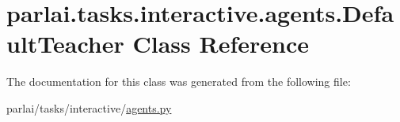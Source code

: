 \hypertarget{classparlai_1_1tasks_1_1interactive_1_1agents_1_1DefaultTeacher}{}\section{parlai.\+tasks.\+interactive.\+agents.\+Default\+Teacher Class Reference}
\label{classparlai_1_1tasks_1_1interactive_1_1agents_1_1DefaultTeacher}


The documentation for this class was generated from the following file\+:\begin{DoxyCompactItemize}
\item 
parlai/tasks/interactive/\hyperlink{parlai_2tasks_2interactive_2agents_8py}{agents.\+py}\end{DoxyCompactItemize}

